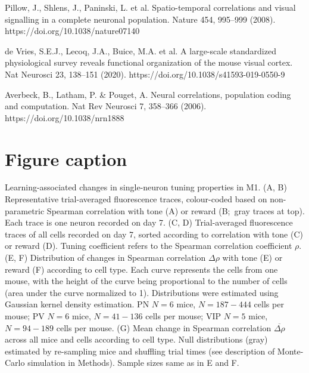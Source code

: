 \documentclass{article}
\begin{document}
Pillow, J., Shlens, J., Paninski, L. et al. Spatio-temporal correlations and
visual signalling in a complete neuronal population. Nature 454, 995–999 (2008).
https://doi.org/10.1038/nature07140

de Vries, S.E.J., Lecoq, J.A., Buice, M.A. et al. A large-scale standardized
physiological survey reveals functional organization of the mouse visual cortex.
Nat Neurosci 23, 138–151 (2020). https://doi.org/10.1038/s41593-019-0550-9

Averbeck, B., Latham, P. \& Pouget, A. Neural correlations, population coding and
computation. Nat Rev Neurosci 7, 358–366 (2006). https://doi.org/10.1038/nrn1888

\section{Figure caption}

Learning-associated changes in single-neuron tuning properties in M1. (A, B)
Representative trial-averaged fluorescence traces, colour-coded based on
non-parametric Spearman correlation with tone (A) or reward (B;\ gray traces at
top). Each trace is one neuron recorded on day 7. (C, D) Trial-averaged
fluorescence traces of all cells recorded on day 7, sorted according to
correlation with tone (C) or reward (D). Tuning coefficient refers to the
Spearman correlation coefficient $\rho$. (E, F) Distribution of changes in
Spearman correlation $\Delta \rho$ with tone (E) or reward (F) according to cell
type. Each curve represents the cells from one mouse, with the height of the
curve being proportional to the number of cells (area under the curve normalized
to 1). Distributions were estimated using Gaussian kernel density estimation. PN
$N=6$ mice, $N = 187 - 444$ cells per mouse; PV $N=6$ mice, $N = 41 - 136$ cells
per mouse; VIP $N=5$ mice, $N = 94 - 189$ cells per mouse.  (G) Mean change in
Spearman correlation $\overline{\Delta \rho}$ across all mice and cells
according to cell type. Null distributions (gray) estimated by re-sampling mice
and shuffling trial times (see description of Monte-Carlo simulation in
Methods). Sample sizes same as in E and F.
\end{document}
